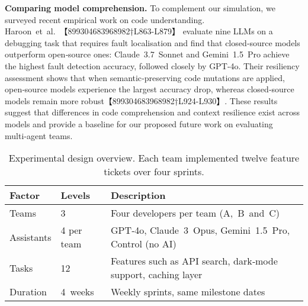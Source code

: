 \documentclass[conference]{IEEEtran}
\begin{document}
\smallskip

\noindent\textbf{Comparing model comprehension.}  To complement our simulation, we surveyed recent empirical work on code understanding.  Haroon et al. 【899304683968982†L863-L879】 evaluate nine LLMs on a debugging task that requires fault localisation and find that closed‑source models outperform open‑source ones: Claude 3.7 Sonnet and Gemini 1.5 Pro achieve the highest fault detection accuracy, followed closely by GPT‑4o.  Their resiliency assessment shows that when semantic‑preserving code mutations are applied, open‑source models experience the largest accuracy drop, whereas closed‑source models remain more robust【899304683968982†L924-L930】.  These results suggest that differences in code comprehension and context resilience exist across models and provide a baseline for our proposed future work on evaluating multi‑agent teams.

\begin{table}[t]
\centering
\caption{Experimental design overview.  Each team implemented twelve feature tickets over four sprints.}
\label{tab:design}
\begin{tabular}{p{2.5cm}p{2cm}p{3cm}}
\toprule
\textbf{Factor} & \textbf{Levels} & \textbf{Description}\\
\midrule
Teams & 3 & Four developers per team (A, B and C) \\
Assistants & 4 per team & GPT‑4o, Claude 3 Opus, Gemini 1.5 Pro, Control (no AI) \\
Tasks & 12 & Features such as API search, dark‑mode support, caching layer \\
Duration & 4 weeks & Weekly sprints, same milestone dates \\
\bottomrule
\end{tabular}
\end{table}
\end{document}
